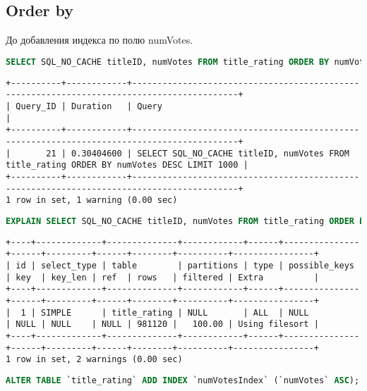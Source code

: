 \documentclass[12pt,a4paper]{article}
\begin{document}
\subsection{Order by}

До добавления индекса по полю numVotes.
\begin{lstlisting}[language=SQL]
SELECT SQL_NO_CACHE titleID, numVotes FROM title_rating ORDER BY numVotes DESC LIMIT 1000;
\end{lstlisting}

\begin{lstlisting}[basicstyle = \tiny\ttfamily, columns = fixed]
+----------+------------+-------------------------------------------------------------------------------------------+
| Query_ID | Duration   | Query                                                                                     |
+----------+------------+-------------------------------------------------------------------------------------------+
|       21 | 0.30404600 | SELECT SQL_NO_CACHE titleID, numVotes FROM title_rating ORDER BY numVotes DESC LIMIT 1000 |
+----------+------------+-------------------------------------------------------------------------------------------+
1 row in set, 1 warning (0.00 sec)
\end{lstlisting}

\begin{lstlisting}[language=SQL]
EXPLAIN SELECT SQL_NO_CACHE titleID, numVotes FROM title_rating ORDER BY numVotes DESC LIMIT 1000;
\end{lstlisting}

\begin{lstlisting}[basicstyle = \tiny\ttfamily, columns = fixed]
+----+-------------+--------------+------------+------+---------------+------+---------+------+--------+----------+----------------+
| id | select_type | table        | partitions | type | possible_keys | key  | key_len | ref  | rows   | filtered | Extra          |
+----+-------------+--------------+------------+------+---------------+------+---------+------+--------+----------+----------------+
|  1 | SIMPLE      | title_rating | NULL       | ALL  | NULL          | NULL | NULL    | NULL | 981120 |   100.00 | Using filesort |
+----+-------------+--------------+------------+------+---------------+------+---------+------+--------+----------+----------------+
1 row in set, 2 warnings (0.00 sec)
\end{lstlisting}

\begin{lstlisting}[language=SQL]
ALTER TABLE `title_rating` ADD INDEX `numVotesIndex` (`numVotes` ASC);
\end{lstlisting}
\end{document}

